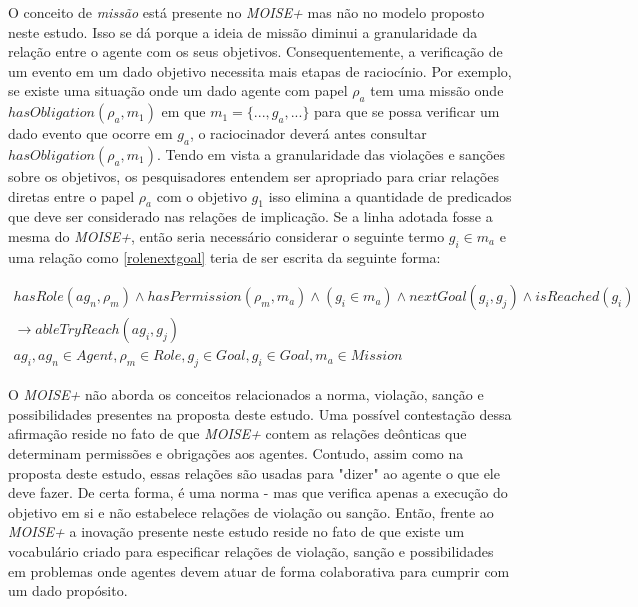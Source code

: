 O conceito de \textit{missão} está presente no \textit{MOISE+} mas não no modelo proposto neste estudo. Isso se dá porque a ideia de missão diminui 
a granularidade da relação entre o agente com os seus objetivos. Consequentemente, a verificação de um evento em um dado objetivo necessita mais etapas 
de raciocínio. Por exemplo, se existe uma situação onde um dado agente com papel $\rho_a$ tem uma missão onde $ hasObligation(\rho_a,m_1) $ em que 
$ m_1 = \{ ... , g_a, ...\}$ para que se possa verificar um dado evento que ocorre em $ g_a $, o raciocinador deverá antes consultar $ hasObligation(\rho_a,m
_1) $. Tendo em vista a granularidade das violações e sanções sobre os objetivos, os pesquisadores entendem ser apropriado para criar relações diretas 
entre o papel $ \rho_a $ com o objetivo $g_1 $ isso elimina a quantidade de predicados que deve ser considerado nas relações de implicação. Se a linha 
adotada fosse a mesma do \textit{MOISE+}, então seria necessário considerar o seguinte termo $ g_i \in m_a $ e uma relação como \ref{rolenextgoal} 
teria de ser escrita da seguinte forma: 

\begin{eqnarray}\label{constmoise01}
	hasRole(ag_n,\rho_m) \wedge hasPermission(\rho_m,m_a) \wedge (g_i \in m_a) \wedge nextGoal(g_i,g_j) \wedge isReached(g_i) \nonumber \\
	\to ableTryReach(ag_i,g_j) \nonumber \\
    ag_i, ag_n \in Agent, \rho_m \in Role, g_j \in Goal, g_i \in Goal, m_a \in Mission
\end{eqnarray}

O \textit{MOISE+} não aborda os conceitos relacionados a norma, violação, sanção e possibilidades presentes na proposta deste estudo. Uma possível 
contestação dessa afirmação reside no fato de que \textit{MOISE+} contem as relações deônticas que determinam permissões e obrigações aos agentes. Contudo,  
assim como na proposta deste estudo, essas relações são usadas para "dizer" ao agente o que ele deve fazer. De certa forma, é uma norma - mas que 
verifica apenas a execução do objetivo em si e não estabelece relações de violação ou sanção. Então, frente ao \textit{MOISE+} a inovação presente 
neste estudo reside no fato de que existe um vocabulário criado para especificar relações de violação, sanção e possibilidades em problemas 
onde agentes devem atuar de forma colaborativa para cumprir com um dado propósito. 
